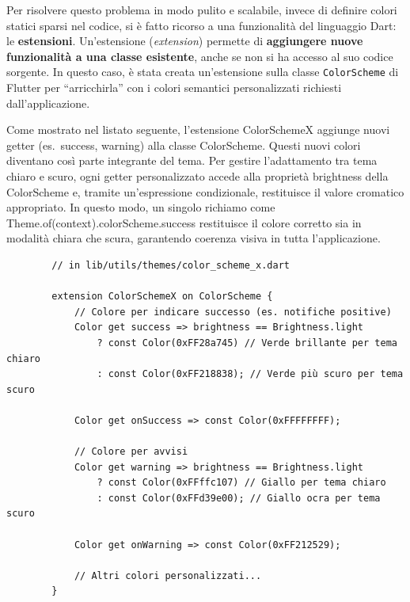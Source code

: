 Per risolvere questo problema in modo pulito e scalabile, invece di definire colori statici sparsi nel codice, si è fatto ricorso a una funzionalità del linguaggio Dart: le \textbf{estensioni}.
Un'estensione (\emph{extension}) permette di \textbf{aggiungere nuove funzionalità a una classe esistente}, anche se non si ha accesso al suo codice sorgente.
In questo caso, è stata creata un'estensione sulla classe \texttt{ColorScheme} di Flutter per ``arricchirla'' con i colori semantici personalizzati richiesti dall'applicazione.

Come mostrato nel listato seguente, l'estensione ColorSchemeX aggiunge nuovi getter (es.\ success, warning) alla classe ColorScheme.
Questi nuovi colori diventano così parte integrante del tema.
Per gestire l'adattamento tra tema chiaro e scuro, ogni getter personalizzato accede alla proprietà brightness della ColorScheme e, tramite un'espressione condizionale, restituisce il valore cromatico appropriato.
In questo modo, un singolo richiamo come Theme.of(context).colorScheme.success restituisce il colore corretto sia in modalità chiara che scura, garantendo coerenza visiva in tutta l'applicazione.

\begin{longlisting}
    \begin{verbatim}
        // in lib/utils/themes/color_scheme_x.dart

        extension ColorSchemeX on ColorScheme {
            // Colore per indicare successo (es. notifiche positive)
            Color get success => brightness == Brightness.light
                ? const Color(0xFF28a745) // Verde brillante per tema chiaro
                : const Color(0xFF218838); // Verde più scuro per tema scuro

            Color get onSuccess => const Color(0xFFFFFFFF);

            // Colore per avvisi
            Color get warning => brightness == Brightness.light
                ? const Color(0xFFffc107) // Giallo per tema chiaro
                : const Color(0xFFd39e00); // Giallo ocra per tema scuro

            Color get onWarning => const Color(0xFF212529);

            // Altri colori personalizzati...
        }
    \end{verbatim}
    \caption{Definizione dell'estensione ``ColorSchemeX'' per aggiungere colori personalizzati al tema.}
    \label{lst:colorscheme_extension}
\end{longlisting}

